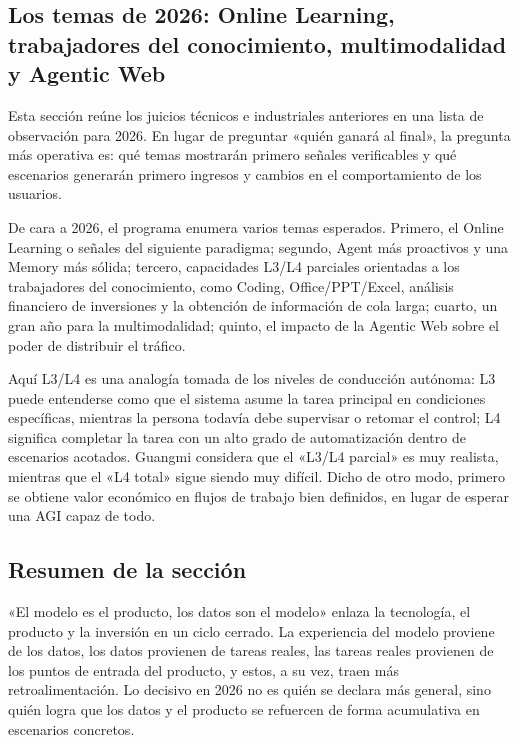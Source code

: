 \subsection{Los temas de 2026: Online Learning, trabajadores del conocimiento, multimodalidad y Agentic Web}

Esta sección reúne los juicios técnicos e industriales anteriores en una lista de observación para 2026. En lugar de preguntar «quién ganará al final», la pregunta más operativa es: qué temas mostrarán primero señales verificables y qué escenarios generarán primero ingresos y cambios en el comportamiento de los usuarios.

De cara a 2026, el programa enumera varios temas esperados. Primero, el Online Learning o señales del siguiente paradigma; segundo, Agent más proactivos y una Memory más sólida; tercero, capacidades L3/L4 parciales orientadas a los trabajadores del conocimiento, como Coding, Office/PPT/Excel, análisis financiero de inversiones y la obtención de información de cola larga; cuarto, un gran año para la multimodalidad; quinto, el impacto de la Agentic Web sobre el poder de distribuir el tráfico.

Aquí L3/L4 es una analogía tomada de los niveles de conducción autónoma: L3 puede entenderse como que el sistema asume la tarea principal en condiciones específicas, mientras la persona todavía debe supervisar o retomar el control; L4 significa completar la tarea con un alto grado de automatización dentro de escenarios acotados. Guangmi considera que el «L3/L4 parcial» es muy realista, mientras que el «L4 total» sigue siendo muy difícil. Dicho de otro modo, primero se obtiene valor económico en flujos de trabajo bien definidos, en lugar de esperar una AGI capaz de todo.

\subsection{Resumen de la sección}

«El modelo es el producto, los datos son el modelo» enlaza la tecnología, el producto y la inversión en un ciclo cerrado. La experiencia del modelo proviene de los datos, los datos provienen de tareas reales, las tareas reales provienen de los puntos de entrada del producto, y estos, a su vez, traen más retroalimentación. Lo decisivo en 2026 no es quién se declara más general, sino quién logra que los datos y el producto se refuercen de forma acumulativa en escenarios concretos.
